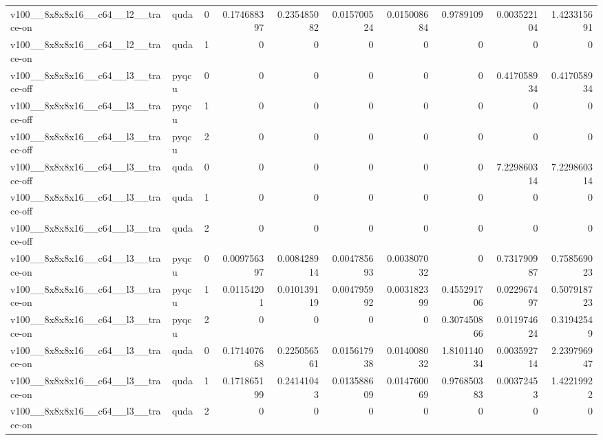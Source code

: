 \begin{table}[htbp]
\begin{tabular}{@{}llrrrrrrrr@{}}
v100\_\_8x8x8x16\_\_c64\_\_l2\_\_trace-on & quda & 0 & 0.174688397 & 0.235485082 & 0.015700524 & 0.015008684 & 0.9789109 & 0.003522104 & 1.423315691 \\
v100\_\_8x8x8x16\_\_c64\_\_l2\_\_trace-on & quda & 1 & 0 & 0 & 0 & 0 & 0 & 0 & 0 \\
v100\_\_8x8x8x16\_\_c64\_\_l3\_\_trace-off & pyqcu & 0 & 0 & 0 & 0 & 0 & 0 & 0.417058934 & 0.417058934 \\
v100\_\_8x8x8x16\_\_c64\_\_l3\_\_trace-off & pyqcu & 1 & 0 & 0 & 0 & 0 & 0 & 0 & 0 \\
v100\_\_8x8x8x16\_\_c64\_\_l3\_\_trace-off & pyqcu & 2 & 0 & 0 & 0 & 0 & 0 & 0 & 0 \\
v100\_\_8x8x8x16\_\_c64\_\_l3\_\_trace-off & quda & 0 & 0 & 0 & 0 & 0 & 0 & 7.229860314 & 7.229860314 \\
v100\_\_8x8x8x16\_\_c64\_\_l3\_\_trace-off & quda & 1 & 0 & 0 & 0 & 0 & 0 & 0 & 0 \\
v100\_\_8x8x8x16\_\_c64\_\_l3\_\_trace-off & quda & 2 & 0 & 0 & 0 & 0 & 0 & 0 & 0 \\
v100\_\_8x8x8x16\_\_c64\_\_l3\_\_trace-on & pyqcu & 0 & 0.009756397 & 0.008428914 & 0.004785693 & 0.003807032 & 0 & 0.731790987 & 0.758569023 \\
v100\_\_8x8x8x16\_\_c64\_\_l3\_\_trace-on & pyqcu & 1 & 0.01154201 & 0.010139119 & 0.004795992 & 0.003182399 & 0.455291706 & 0.022967497 & 0.507918723 \\
v100\_\_8x8x8x16\_\_c64\_\_l3\_\_trace-on & pyqcu & 2 & 0 & 0 & 0 & 0 & 0.307450866 & 0.011974624 & 0.31942549 \\
v100\_\_8x8x8x16\_\_c64\_\_l3\_\_trace-on & quda & 0 & 0.171407668 & 0.225056561 & 0.015617938 & 0.014008032 & 1.810114034 & 0.003592714 & 2.239796947 \\
v100\_\_8x8x8x16\_\_c64\_\_l3\_\_trace-on & quda & 1 & 0.171865199 & 0.24141043 & 0.013588609 & 0.014760069 & 0.976850383 & 0.00372453 & 1.42219922 \\
v100\_\_8x8x8x16\_\_c64\_\_l3\_\_trace-on & quda & 2 & 0 & 0 & 0 & 0 & 0 & 0 & 0 \\
\bottomrule
\end{tabular}
\end{table}

